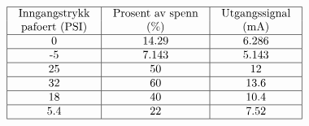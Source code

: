

$$\vbox{\offinterlineskip
\halign{\strut
\vrule \quad\hfil # \ \hfil & 
\vrule \quad\hfil # \ \hfil & 
\vrule \quad\hfil # \ \hfil \vrule \cr
\noalign{\hrule}
%
Inngangstrykk & Prosent av spenn & Utgangssignal \cr
%
pafoert (PSI) & (\%) & (mA) \cr
%
\noalign{\hrule}
%
0 & 14.29 & 6.286 \cr
%
\noalign{\hrule}
%
-5 & 7.143 & 5.143 \cr
%
\noalign{\hrule}
%
25 & 50 & 12 \cr
%
\noalign{\hrule}
%
32 & 60 & 13.6 \cr
%
\noalign{\hrule}
%
18 & 40 & 10.4 \cr
%
\noalign{\hrule}
%
5.4 & 22 & 7.52 \cr
%
\noalign{\hrule}
} %
}$$ %





